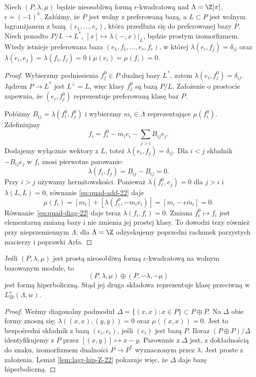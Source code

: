 \begin{lemat}
\label{lem:lagr-hip-Z-22}
Niech $(P,\lambda,\mu)$ będzie nieosobliwą
formą $\epsilon$-kwadratową nad
$\Lambda=\Z[\pi]$, $\epsilon=(-1)^k$.
Załóżmy, że $P$ jest wolny z preferowaną bazą,
a $L\subset P$ jest wolnym lagranżjanem z bazą
$(e_1,\ldots,e_r)$, która przedłuża się do
preferowanej bazy $P$. Niech ponadto
$P/L\to L^*$, $[x]\mapsto\lambda(-,x)|_L$,
będzie prostym izomorfizmem.
Wtedy istnieje preferowana baza
$(e_1,f_1,\ldots,e_r,f_r)$, w której
$\lambda(e_i,f_j)=\delta_{ij}$ oraz
$\lambda(e_i,e_j)=\lambda(f_i,f_j)=0$ i
$\mu(e_i)=\mu(f_i)=0$.
\end{lemat}
\begin{proof}
Wybierzmy podniesienia $f_j^0\in P$ dualnej
bazy $L^*$, zatem
$\lambda(e_i,f_j^0)=\delta_{ij}$.
Jądrem $P\to L^*$ jest $L^\perp=L$,
więc klasy $f_j^0$ są bazą $P/L$.
Założenie o prostocie zapewnia, że
$(e_i,f_j^0)$ reprezentuje preferowaną
klasę baz $P$.

Połóżmy $B_{ij}=\lambda(f_i^0,f_j^0)$
i wybierzmy $m_i\in\Lambda$ reprezentujące
$\mu(f_i^0)$. Zdefiniujmy
\begin{equation}\label{eq:poprawka-lagr-Wall-22}
 f_i=f_i^0-m_i e_i-
       \sum_{j>i}B_{ij}e_j.
\end{equation}
Dodajemy wyłącznie wektory z $L$, toteż
$\lambda(e_i,f_j)=\delta_{ij}$.
Dla $i<j$ składnik $-B_{ij}e_j$ w $f_i$
znosi pierwotne parowanie:
\[
 \lambda(f_i,f_j)=B_{ij}-B_{ij}=0.
\]
Przy $i>j$ używamy hermitowskości.
Ponieważ $\lambda(f_i^0,e_j)=0$ dla $j>i$
i $\lambda(L,L)=0$, równanie
\eqref{eq:quad-add-22} daje
\[
 \mu(f_i)=[m_i]+[\lambda(f_i^0,-m_i e_i)]
   =[m_i-\epsilon\bar m_i]=0.
\]
Równanie~\eqref{eq:quad-diag-22} daje teraz
$\lambda(f_i,f_i)=0$.
Zmiana $f_i^0\mapsto f_i$ jest elementarną
zmianą bazy i nie zmienia jej prostej klasy.
To dowodzi tezy również przy nieprzemiennym
$\Lambda$; dla $\Lambda=\Z$ odzyskujemy
poprzedni rachunek parzystych macierzy
i poprawki Arfa.
\end{proof}

\begin{stwierdzenie}
\label{prop:odwrotna-forma-Wall-22}
Jeśli $(P,\lambda,\mu)$ jest prostą
nieosobliwą formą $\epsilon$-kwadratową
na wolnym bazowanym module, to
\[
 (P,\lambda,\mu)\oplus(P,-\lambda,-\mu)
\]
jest formą hiperboliczną. Stąd jej druga
składowa reprezentuje klasę przeciwną
w $L^s_{2k}(\Lambda,w)$.
\end{stwierdzenie}
\begin{proof}
Weźmy diagonalny podmoduł
$\Delta=\{(x,x):x\in P\}\subset P\oplus P$.
Na $\Delta$ obie formy znoszą się:
$\lambda((x,x),(y,y))=0$ oraz
$\mu((x,x))=0$. Jest to bezpośredni
składnik z bazą $(e_i,e_i)$, jeśli
$(e_i)$ jest bazą $P$. Iloraz
$(P\oplus P)/\Delta$ identyfikujemy
z $P$ przez $[(x,y)]\mapsto x-y$.
Parowanie z $\Delta$ jest, z dokładnością
do znaku, izomorfizmem dualności
$P\to P^*$ wyznaczonym przez $\lambda$.
Jest proste z założenia. Lemat
\ref{lem:lagr-hip-Z-22} pokazuje więc,
że $\Delta$ daje bazę hiperboliczną.
\end{proof}

